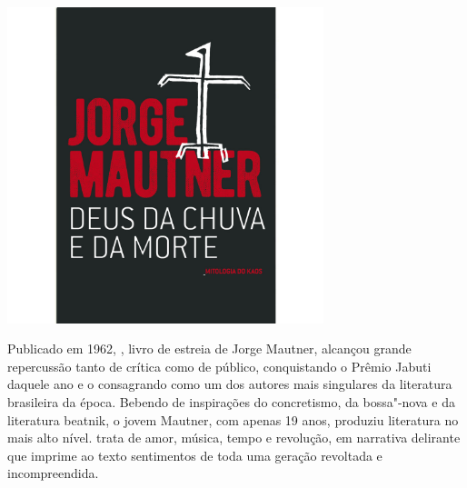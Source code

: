 \vfill

\hspace*{-.4cm}\begin{minipage}[c]{.5\linewidth}
\small{
{}}
\end{minipage}


\pagebreak

\hspace{.5cm}

\begin{center}
\hspace*{.5cm}\includegraphics[width=92mm]{./grid/mautner.jpg}
\end{center}

\hspace*{-7cm}\hrulefill\hspace*{-7cm}

\medskip

\noindent{}Publicado em 1962, {}, livro de estreia de Jorge Mautner, alcançou grande repercussão tanto de crítica como de público, conquistando o Prêmio Jabuti daquele ano e o consagrando como um dos autores mais singulares da literatura brasileira da época. Bebendo de inspirações do concretismo, da bossa"-nova e da literatura beatnik, o jovem Mautner, com apenas 19 anos, produziu literatura no mais alto nível. {} trata de amor, música, tempo e revolução, em narrativa delirante que imprime ao texto sentimentos de toda uma geração revoltada e incompreendida.

